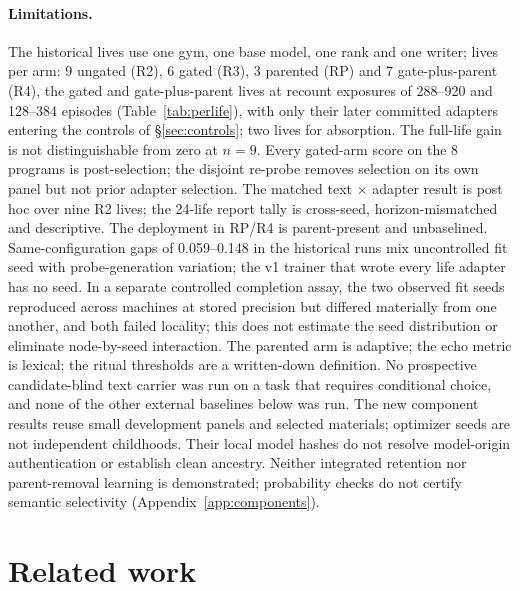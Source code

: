 \documentclass{article}
\begin{document}
\paragraph{Limitations.} The historical lives use one gym, one base model, one rank and one writer; lives per arm: 9 ungated (R2), 6 gated (R3), 3 parented (RP) and 7 gate-plus-parent (R4), the gated and gate-plus-parent lives at recount exposures of 288--920 and 128--384 episodes (Table~\ref{tab:perlife}), with only their later committed adapters entering the controls of \S\ref{sec:controls}; two lives for absorption. The full-life gain is not distinguishable from zero at $n = 9$. Every gated-arm score on the 8 programs is post-selection; the disjoint re-probe removes selection on its own panel but not prior adapter selection. The matched text $\times$ adapter result is post hoc over nine R2 lives; the 24-life report tally is cross-seed, horizon-mismatched and descriptive. The deployment in RP/R4 is parent-present and unbaselined. Same-configuration gaps of 0.059--0.148 in the historical runs mix uncontrolled fit seed with probe-generation variation; the v1 trainer that wrote every life adapter has no seed. In a separate controlled completion assay, the two observed fit seeds reproduced across machines at stored precision but differed materially from one another, and both failed locality; this does not estimate the seed distribution or eliminate node-by-seed interaction. The parented arm is adaptive; the echo metric is lexical; the ritual thresholds are a written-down definition. No prospective candidate-blind text carrier was run on a task that requires conditional choice, and none of the other external baselines below was run. The new component results reuse small development panels and selected materials; optimizer seeds are not independent childhoods. Their local model hashes do not resolve model-origin authentication or establish clean ancestry. Neither integrated retention nor parent-removal learning is demonstrated; probability checks do not certify semantic selectivity (Appendix~\ref{app:components}).

\section{Related work}
\label{sec:related}
\end{document}
